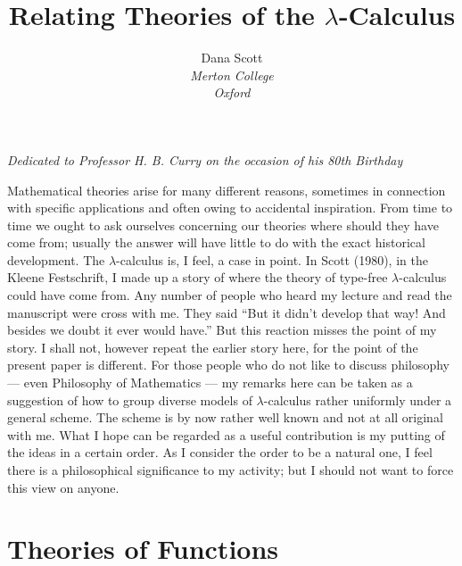 \documentclass[12pt]{article}
\date{}
\title{Relating Theories of the $\lambda$-Calculus}
\author{Dana Scott \\
{\small\it Merton College}\\
{\small\it Oxford}}
\def\l{\lambda}
\begin{document}
\maketitle
\bigskip
{\centerline
{\small\it Dedicated to Professor H. B. Curry on the occasion of his 80th Birthday}}
\bigskip

\medskip
\noindent
Mathematical theories arise for many different reasons, sometimes in connection with specific applications and often owing to accidental inspiration. From time to time we ought to ask ourselves concerning our theories where should they have come from; usually the answer will have little to do with the exact historical development. The $\l$-calculus is, I feel, a case in point. In Scott (1980), in the Kleene Festschrift, I made up a story of where the theory of type-free $\l$-calculus could have come from. Any number of people who heard my lec­ture and read the manuscript were cross with me. They said ``But it didn't develop that way! And besides we doubt it ever would have.'' But this reaction misses the point of my story. I shall not, however repeat the earlier story here, for the point of the present paper is different. For those people who do not like to discuss philosophy --- even Philosophy of Mathematics --- my remarks here can be taken as a suggestion of how to group diverse models of $\l$-calculus rather uniformly under a general scheme. The scheme is by now rather well known and not at all original with me. What I hope can be regarded as a useful con­tribution is my putting of the ideas in a certain order. As I consider the order to be a natural one, I feel there is a philosophical significance to my activity; but I should not want to force this view on anyone.

\section{Theories of Functions}
\end{document}
